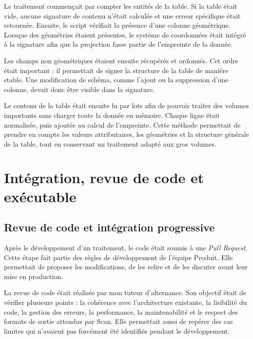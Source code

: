 Le traitement commençait par compter les entités de la table. Si la table était
vide, aucune signature de contenu n'était calculée et une erreur spécifique
était retournée. Ensuite, le script vérifiait la présence d'une colonne
géométrique. Lorsque des géométries étaient présentes, le système de coordonnées
était intégré à la signature afin que la projection fasse partie de l'empreinte
de la donnée.

Les champs non géométriques étaient ensuite récupérés et ordonnés. Cet ordre
était important : il permettait de signer la structure de la table de manière
stable. Une modification de schéma, comme l'ajout ou la suppression d'une
colonne, devait donc être visible dans la signature.

Le contenu de la table était ensuite lu par lots afin de pouvoir traiter des
volumes importants sans charger toute la donnée en mémoire. Chaque ligne était
normalisée, puis ajoutée au calcul de l'empreinte. Cette méthode permettait de
prendre en compte les valeurs attributaires, les géométries et la structure
générale de la table, tout en conservant un traitement adapté aux gros volumes.


\section{Intégration, revue de code et exécutable}
\label{sec:packaging_fil_developpements}


\subsection{Revue de code et intégration progressive}
\label{subsec:revue_code_integration}

Après le développement d'un traitement, le code était soumis à une
\textit{Pull Request}. Cette étape fait partie des règles de développement de l'équipe Produit. Elle permettait de proposer les modifications, de les relire et
de les discuter avant leur mise en production.

La revue de code était réalisée par mon tuteur d'alternance. Son objectif était
de vérifier plusieurs points : la cohérence avec l'architecture existante, la
lisibilité du code, la gestion des erreurs, la performance, la maintenabilité et
le respect des formats de sortie attendus par Scan. Elle permettait aussi de
repérer des cas limites qui n'avaient pas forcément été identifiés pendant le
développement.


